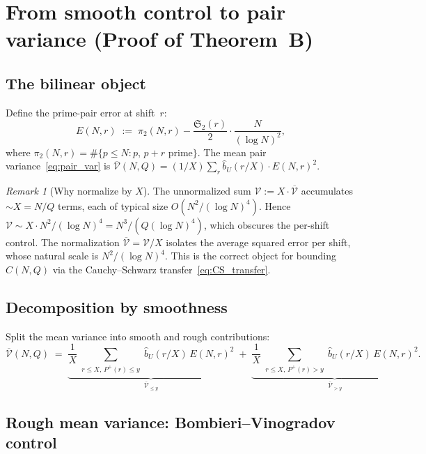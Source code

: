 \documentclass[11pt,reqno]{amsart}
\theoremstyle{plain}
\theoremstyle{definition}
\theoremstyle{remark}
\newtheorem{remark}[theorem]{Remark}
\newcommand{\Sfrak}{\mathfrak{S}_2}
\newcommand{\Pplus}{P^{+}}
\begin{document}
\section{From smooth control to pair variance
  (Proof of Theorem~B)}\label{sec:thmB}

\subsection{The bilinear object}

Define the prime-pair error at shift~$r$:
\begin{equation}\label{eq:E_r}
  E(N,r) \;:=\;
  \pi_2(N,r) - \frac{\Sfrak(r)}{2} \cdot \frac{N}{(\log N)^2},
\end{equation}
where $\pi_2(N,r) = \#\{p \le N : p,\, p+r \text{ prime}\}$.
The mean pair variance~\eqref{eq:pair_var} is
$\overline{\mathcal{V}}(N,Q) = (1/X)\sum_{r}
\hat{b}_U(r/X) \cdot E(N,r)^2$.

\begin{remark}[Why normalize by $X$]\label{rem:normalize}
The unnormalized sum $\mathcal{V} := X \cdot \overline{\mathcal{V}}$
accumulates $\sim X = N/Q$ terms, each of typical size
$O(N^2/(\log N)^4)$. Hence $\mathcal{V} \sim X \cdot N^2/(\log N)^4
= N^3/(Q(\log N)^4)$, which obscures the per-shift control.
The normalization $\overline{\mathcal{V}} = \mathcal{V}/X$ isolates
the average squared error per shift, whose natural scale is
$N^2/(\log N)^4$. This is the correct object for bounding $C(N,Q)$
via the Cauchy--Schwarz transfer~\eqref{eq:CS_transfer}.
\end{remark}

\subsection{Decomposition by smoothness}

Split the mean variance into smooth and rough contributions:
\begin{equation}\label{eq:V_split}
  \overline{\mathcal{V}}(N,Q) \;=\;
  \underbrace{\frac{1}{X}\sum_{\substack{r \le X,\,\Pplus(r) \le y}}
  \hat{b}_U(r/X)\, E(N,r)^2}_{\overline{\mathcal{V}}_{\le y}}
  \;+\;
  \underbrace{\frac{1}{X}\sum_{\substack{r \le X,\,\Pplus(r) > y}}
  \hat{b}_U(r/X)\, E(N,r)^2}_{\overline{\mathcal{V}}_{> y}}.
\end{equation}

\subsection{Rough mean variance: Bombieri--Vinogradov control}
\end{document}
